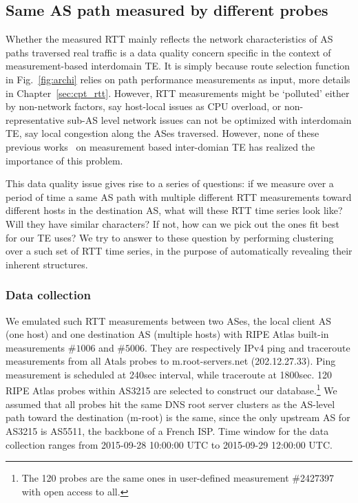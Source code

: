 \subsection{Same AS path measured by different probes}
Whether the measured RTT mainly reflects the network characteristics of AS paths traversed real traffic is a data quality concern specific in the context of measurement-based interdomain TE.
It is simply because route selection function in Fig.~\ref{fig:archi} relies on path performance measurements as input, more details in Chapter~\ref{sec:cpt_rtt}.
However, RTT measurements might be `polluted' either by non-network factors, say host-local issues as CPU overload, or non-representative sub-AS level network issues can not be optimized with interdomain TE, say local congestion along the ASes traversed. 
However, none of these previous works~\cite{Goldenberg2004, Akella2008} on measurement based inter-domian TE has realized the importance of this problem.

This data quality issue gives rise to a series of questions: if we measure over a period of time a same AS path with multiple different RTT measurements toward different hosts in the destination AS, what will these RTT time series look like? Will they have similar characters? If not, how can we pick out the ones fit best for our TE uses?
We try to answer to these question by performing clustering over a such set of RTT time series, in the purpose of automatically revealing their inherent structures.

\subsubsection{Data collection}
We emulated such RTT measurements between two ASes, the local client AS (one host) and one destination AS (multiple hosts) with RIPE Atlas built-in measurements $\#1006$ and $\#5006$.
They are respectively IPv4 ping and traceroute measurements from all Atals probes to m.root-servers.net (202.12.27.33). 
Ping measurement is scheduled at 240sec interval, while traceroute at 1800sec.
120 RIPE Atlas probes within AS3215 are selected to construct our database.\footnote{The 120 probes are the same ones in user-defined measurement \#2427397 with open access to all.}
We assumed that all probes hit the same DNS root server clusters as the AS-level path toward the destination (m-root) is the same, since the only upstream AS for AS3215 is AS5511, the backbone of a French \ac{ISP}. Time window for the data collection ranges from 2015-09-28 10:00:00 UTC to 2015-09-29 12:00:00 UTC.

